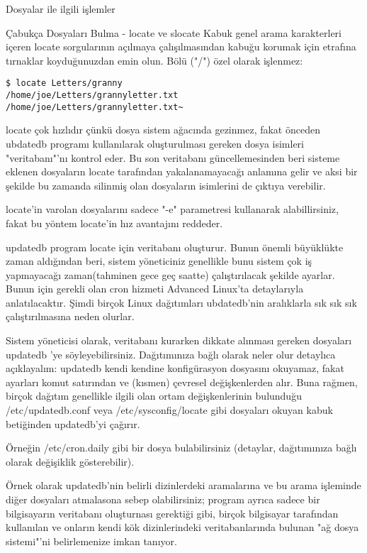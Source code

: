 \begin{section}{Dosyalar ile ilgili işlemler}
\begin{subsection}{Çabukça Dosyaları Bulma - locate ve slocate}
Kabuk genel arama karakterleri içeren locate sorgularının açılmaya çalışılmasından kabuğu korumak için etrafına tırnaklar koyduğunuzdan emin olun.
Bölü ("/") özel olarak işlenmez:
\begin{verbatim}
$ locate Letters/granny
/home/joe/Letters/grannyletter.txt
/home/joe/Letters/grannyletter.txt~
\end{verbatim}

locate çok hızlıdır çünkü dosya sistem ağacında gezinmez, fakat önceden ubdatedb programı kullanılarak oluşturulması gereken dosya isimleri "veritabanı"'nı kontrol eder. Bu son veritabanı güncellemesinden beri sisteme eklenen dosyaların locate tarafından yakalanamayacağı anlamına gelir ve aksi bir şekilde bu zamanda silinmiş olan dosyaların isimlerini de çıktıya verebilir.

locate'in varolan dosyalarını sadece "-e" parametresi kullanarak alabillirsiniz, fakat bu yöntem locate'in hız avantajını reddeder.

updatedb program locate için veritabanı oluşturur. Bunun önemli büyüklükte zaman aldığından beri, sistem yöneticiniz genellikle bunu sistem çok iş yapmayacağı zaman(tahminen gece geç saatte) çalıştırılacak şekilde ayarlar. Bunun için gerekli olan cron hizmeti Advanced Linux'ta detaylarıyla anlatılacaktır. Şimdi birçok Linux dağıtımları ubdatedb'nin aralıklarla sık sık sık çalıştırılmasına neden olurlar.

Sistem yöneticisi olarak, veritabanı kurarken dikkate alınması gereken dosyaları updatedb 'ye söyleyebilirsiniz. Dağıtımınıza bağlı olarak neler olur detaylıca açıklayalım: updatedb kendi kendine konfigürasyon dosyasını okuyamaz, fakat ayarları komut satırından ve (kısmen) çevresel değişkenlerden alır. Buna rağmen, birçok dağıtım genellikle ilgili olan ortam değişkenlerinin bulunduğu /etc/updatedb.conf veya /etc/sysconfig/locate gibi dosyaları okuyan kabuk betiğinden updatedb'yi çağırır.

	Örneğin /etc/cron.daily gibi bir dosya bulabilirsiniz (detaylar, dağıtımınıza bağlı olarak değişiklik gösterebilir).
	
	Örnek olarak updatedb'nin belirli dizinlerdeki aramalarına ve bu arama işleminde diğer dosyaları atmalasona sebep olabilirsiniz; program ayrıca sadece bir bilgisayarın veritabanı oluşturnası gerektiği gibi, birçok bilgisayar  tarafından kullanılan ve onların kendi kök dizinlerindeki veritabanlarında bulunan "ağ dosya sistemi"'ni belirlemenize imkan tanıyor.
	

\end{subsection}
\end{section}
